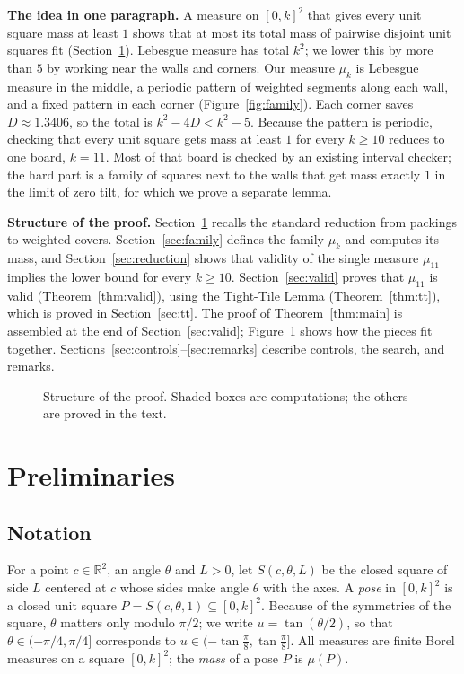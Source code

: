 \documentclass[11pt]{amsart}
\theoremstyle{definition}
\theoremstyle{remark}
\newcommand{\R}{\mathbb R}
\begin{document}
\smallskip
\noindent\textbf{The idea in one paragraph.} A measure on $[0,k]^2$ that gives every unit square mass at least $1$ shows
that at most its total mass of pairwise disjoint unit squares fit (Section~\ref{sec:prelim}). Lebesgue measure has total
$k^2$; we lower this by more than $5$ by working near the walls and corners. Our measure $\mu_k$ is Lebesgue measure in
the middle, a periodic pattern of weighted segments along each wall, and a fixed pattern in each corner
(Figure~\ref{fig:family}). Each corner saves $D\approx1.3406$, so the total is $k^2-4D<k^2-5$. Because the
pattern is periodic, checking that every unit square gets mass at least $1$ for every $k\ge10$ reduces to one board,
$k=11$. Most of that board is checked by an existing interval checker; the hard part is a family of squares next to
the walls that get mass exactly $1$ in the limit of zero tilt, for which we prove a separate lemma.

\smallskip
\noindent\textbf{Structure of the proof.} Section~\ref{sec:prelim} recalls the standard reduction from packings to
weighted covers. Section~\ref{sec:family} defines the family $\mu_k$ and computes its mass, and
Section~\ref{sec:reduction} shows that validity of the single measure $\mu_{11}$ implies the lower bound for every
$k\ge10$. Section~\ref{sec:valid} proves that $\mu_{11}$ is valid (Theorem~\ref{thm:valid}), using the Tight-Tile
Lemma (Theorem~\ref{thm:tt}), which is proved in Section~\ref{sec:tt}. The proof of Theorem~\ref{thm:main} is
assembled at the end of Section~\ref{sec:valid}; Figure~\ref{fig:proofmap} shows how the pieces fit together.
Sections~\ref{sec:controls}--\ref{sec:remarks} describe controls, the search, and remarks.

\begin{figure}[ht]
\centering
\caption{Structure of the proof. Shaded boxes are computations; the others are proved in the text.}
\label{fig:proofmap}
\end{figure}

\section{Preliminaries}\label{sec:prelim}

\subsection*{Notation}
For a point $c\in\R^2$, an angle $\theta$ and $L>0$, let $S(c,\theta,L)$ be the closed square of side $L$ centered at
$c$ whose sides make angle $\theta$ with the axes. A \emph{pose} in $[0,k]^2$ is a closed unit square
$P=S(c,\theta,1)\subseteq[0,k]^2$. Because of the symmetries of the square, $\theta$ matters only modulo $\pi/2$; we
write $u=\tan(\theta/2)$, so that $\theta\in(-\pi/4,\pi/4]$ corresponds to $u\in(-\tan\frac\pi8,\tan\frac\pi8]$.
All measures are finite Borel measures on a square $[0,k]^2$; the \emph{mass} of a pose $P$ is $\mu(P)$.
\end{document}
